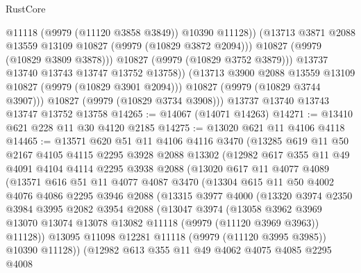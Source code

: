 \begin{lexlean}{RustCore}
\begin{coremodule}
                    @11118
                    (@9979 (@11120 @3858 @3849))
                    @10390
                    @11128))
                (@13713 @3871 @2088 @13559 @13109 @10827 (@9979 (@10829 @3872 @2094)))
                @10827
                (@9979 (@10829 @3809 @3878)))
              @10827
              (@9979 (@10829 @3752 @3879)))
            @13737
            @13740
            @13743
            @13747
            @13752
            @13758))
        (@13713 @3900 @2088 @13559 @13109 @10827 (@9979 (@10829 @3901 @2094)))
        @10827
        (@9979 (@10829 @3744 @3907)))
      @10827
      (@9979 (@10829 @3734 @3908)))
    @13737
    @13740
    @13743
    @13747
    @13752
    @13758
@14265 := @14067 (@14071 @14263)
@14271 := @13410 @621 @228 @11 @30 @4120 @2185
@14275 := @13020 @621 @11 @4106 @4118
@14465 := @13571
    @620
    @51
    @11
    @4106
    @4116
    @3470
    (@13285
      @619
      @11
      @50
      @2167
      @4105
      @4115
      @2295
      @3928
      @2088
      @13302
      (@12982
        @617
        @355
        @11
        @49
        @4091
        @4104
        @4114
        @2295
        @3938
        @2088
        (@13020
          @617
          @11
          @4077
          @4089
          (@13571
            @616
            @51
            @11
            @4077
            @4087
            @3470
            (@13304
              @615
              @11
              @50
              @4002
              @4076
              @4086
              @2295
              @3946
              @2088
              (@13315
                @3977
                @4000
                (@13320
                  @3974
                  @2350
                  @3984
                  @3995
                  @2082
                  @3954
                  @2088
                  (@13047
                    @3974
                    (@13058
                      @3962
                      @3969
                      @13070
                      @13074
                      @13078
                      @13082
                      @11118
                      (@9979 (@11120 @3969 @3963))
                      @11128))
                  @13095
                  @11098
                  @12281
                  @11118
                  (@9979 (@11120 @3995 @3985))
                  @10390
                  @11128))
              (@12982
                @613
                @355
                @11
                @49
                @4062
                @4075
                @4085
                @2295
                @4008

\end{coremodule}
\end{lexlean}
